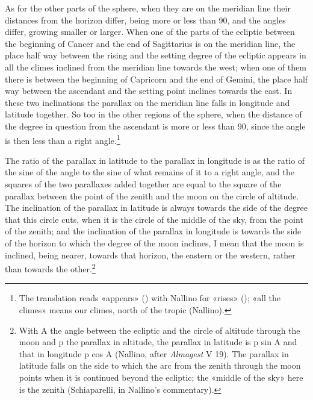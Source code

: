 \documentclass[11pt]{article}
\begin{document}
\par As for the other parts of the sphere, when they are on the meridian line their distances from the horizon differ, being more or less than 90, and the angles differ, growing smaller or larger. When one of the parts of the ecliptic between the beginning of Cancer and the end of Sagittarius is on the meridian line, the place half way between the rising and the setting degree of the ecliptic appears in all the climes inclined from the meridian line towards the west; when one of them there is between the beginning of Capricorn and the end of Gemini, the place half way between the ascendant and the setting point inclines towards the east. In these two inclinations the parallax on the meridian line falls in longitude and latitude together. So too in the other regions of the sphere, when the distance of the degree in question from the ascendant is more or less than 90, since the angle is then less than a right angle.\footnote{The translation reads «appears» () with Nallino for «rises» (); «all the climes» means our climes, north of the tropic (Nallino).}\par
\par The ratio of the parallax in latitude to the parallax in longitude is as the ratio of the sine of the angle to the sine of what remains of it to a right angle, and the squares of the two parallaxes added together are equal to the square of the parallax between the point of the zenith and the moon on the circle of altitude. The inclination of the parallax in latitude is always towards the side of the degree that this circle cuts, when it is the circle of the middle of the sky, from the point of the zenith; and the inclination of the parallax in longitude is towards the side of the horizon to which the degree of the moon inclines, I mean that the moon is inclined, being nearer, towards that horizon, the eastern or the western, rather than towards the other.\footnote{With A the angle between the ecliptic and the circle of altitude through the moon and p the parallax in altitude, the parallax in latitude is p sin A and that in longitude p cos A (Nallino, after \emph{Almagest} V 19). The parallax in latitude falls on the side to which the arc from the zenith through the moon points when it is continued beyond the ecliptic; the «middle of the sky» here is the zenith (Schiaparelli, in Nallino's commentary).}\par
\end{document}
